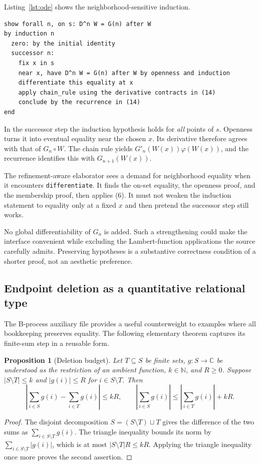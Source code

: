 \documentclass[11pt,letterpaper]{article}
\newcommand{\code}[1]{\nolinkurl{#1}}
\newcommand{\N}{\mathbb N}
\newcommand{\C}{\mathbb C}
\newtheorem{proposition}[theorem]{Proposition}
\theoremstyle{definition}
\theoremstyle{remark}
\begin{document}
Listing~\ref{lst:ode} shows the neighborhood-sensitive induction.
\begin{lstlisting}[float=htbp,caption={Differentiation of an on-set induction hypothesis.},captionpos=t,label={lst:ode}]
show forall n, on s: D^n W = G(n) after W
by induction n
  zero: by the initial identity
  successor n:
    fix x in s
    near x, have D^n W = G(n) after W by openness and induction
    differentiate this equality at x
    apply chain_rule using the derivative contracts in (14)
    conclude by the recurrence in (14)
end
\end{lstlisting}
In the successor step the induction hypothesis holds for \emph{all} points of
$s$. Openness turns it into eventual equality near the chosen $x$. Its derivative
therefore agrees with that of $G_n\circ W$. The chain rule yields
$G'_n(W(x))\varphi(W(x))$, and the recurrence identifies this with
$G_{n+1}(W(x))$.

The refinement-aware elaborator sees a demand for neighborhood equality when it
encounters \code{differentiate}. It finds the on-set equality, the openness
proof, and the membership proof, then applies (6). It must not weaken the
induction statement to equality only at a fixed $x$ and then pretend the
successor step still works.

No global differentiability of $G_n$ is added. Such a strengthening could make the
interface convenient while excluding the Lambert-function applications the
source carefully admits. Preserving hypotheses is a substantive correctness
condition of a shorter proof, not an aesthetic preference.

\subsection{Endpoint deletion as a quantitative relational type}\label{sec:endpoints}
The B-process auxiliary file provides a useful counterweight to examples where
all bookkeeping preserves equality. The following elementary theorem captures
its finite-sum step in a reusable form.

\begin{proposition}[Deletion budget]\label{prop:delete}
Let $T\subseteq S$ be finite sets, $g:S\to\C$ be understood as the restriction of
an ambient function, $k\in\N$, and $R\ge0$. Suppose
$|S\setminus T|\le k$ and $|g(i)|\le R$ for $i\in S\setminus T$. Then
\[
\left|\sum_{i\in S}g(i)-\sum_{i\in T}g(i)\right|\le kR,
\qquad
\left|\sum_{i\in S}g(i)\right|
\le\left|\sum_{i\in T}g(i)\right|+kR.
\tag{16}
\]
\end{proposition}
\begin{proof}
The disjoint decomposition $S=(S\setminus T)\sqcup T$ gives the difference of the
two sums as $\sum_{i\in S\setminus T}g(i)$. The triangle inequality bounds its
norm by $\sum_{i\in S\setminus T}|g(i)|$, which is at most
$|S\setminus T|R\le kR$. Applying the triangle inequality once more proves the
second assertion.
\end{proof}
\end{document}
